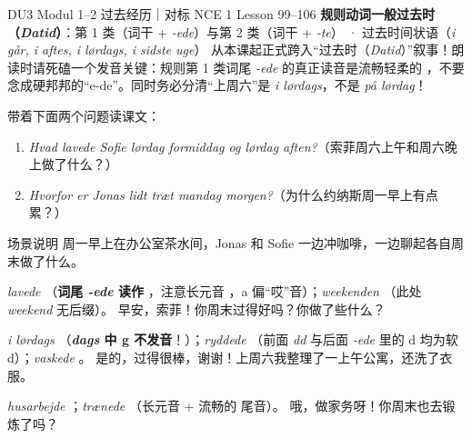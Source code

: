 {DU3 Modul 1--2 过去经历｜对标 NCE 1 Lesson 99--106}
{\textbf{规则动词一般过去时（\textit{Datid}）}：第 1 类（词干 + \textit{-ede}）与第 2 类（词干 + \textit{-te}） · 过去时间状语（\textit{i går, i aftes, i lørdags, i sidste uge}）}
{从本课起正式跨入“过去时（\textit{Datid}）”叙事！朗读时请死磕一个发音关键：规则第 1 类词尾 \textit{-ede} 的真正读音是流畅轻柔的 ，不要念成硬邦邦的“e-de”。同时务必分清“上周六”是 \textit{i lørdags}，不是 \textit{på lørdag}！}

\begin{foerduleaeser}
带着下面两个问题读课文：
\begin{enumerate}
  \item \textit{Hvad lavede Sofie lørdag formiddag og lørdag aften?}（索菲周六上午和周六晚上做了什么？）
  \item \textit{Hvorfor er Jonas lidt træt mandag morgen?}（为什么约纳斯周一早上有点累？）
\end{enumerate}
\end{foerduleaeser}


\begin{tipbox}{场景说明}
周一早上在办公室茶水间，Jonas 和 Sofie 一边冲咖啡，一边聊起各自周末做了什么。
\end{tipbox}

{\textit{lavede} （\textbf{词尾 \textit{-ede} 读作 }，注意长元音 ，a 偏“哎”音）；\textit{weekenden} （此处 \textit{weekend} 无后缀）。}
{早安，索菲！你周末过得好吗？你做了些什么？}

{\textit{i lørdags} （\textbf{\textit{dags} 中 g 不发音}！）；\textit{ryddede} （前面 \textit{dd} 与后面 \textit{-ede} 里的 d 均为软 d）；\textit{vaskede} 。}
{是的，过得很棒，谢谢！上周六我整理了一上午公寓，还洗了衣服。}

{\textit{husarbejde} ；\textit{trænede} （长元音  + 流畅的  尾音）。}
{哦，做家务呀！你周末也去锻炼了吗？}

